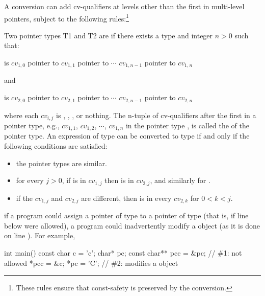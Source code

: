 \pnum
A conversion can add cv-qualifiers at levels other than the first in
multi-level pointers, subject to the following rules:\footnote{These rules ensure that const-safety is preserved by the conversion.}
\begin{indented}
Two pointer types T1 and T2 are  if there exists a
type  and integer $n > 0$ such that:

\begin{indented}
 is $\mathit{cv}_{1,0}$ pointer to $\mathit{cv}_{1,1}$ pointer
to $\cdots$ $\mathit{cv}_{1,n-1}$ pointer to $\mathit{cv}_{1,n}$
\end{indented}

and
\begin{indented}
 is $\mathit{cv}_{2,0}$ pointer to $\mathit{cv}_{2,1}$ pointer
to $\cdots$ $\mathit{cv}_{2,n-1}$ pointer to $\mathit{cv}_{2,n}$
\end{indented}

where each $\mathit{cv}_{i,j}$ is , ,
, or nothing. The n-tuple of cv-qualifiers after
the first in a pointer type, e.g.,
$\mathit{cv}_{1,1}$, $\mathit{cv}_{1,2}$, $\cdots$, $\mathit{cv}_{1,n}$
in the pointer type , is called the  of the pointer type. An expression of type  can be
converted to type  if and only if the following conditions are
satisfied:

\begin{itemize}
\item the pointer types are similar.

\item for every $j > 0$, if  is in $\mathit{cv}_{1,j}$ then  is in $\mathit{cv}_{2,j}$, and similarly for .

\item if the $\mathit{cv}_{1,j}$ and $\mathit{cv}_{2,j}$ are different,
then  is in every $\mathit{cv}_{2,k}$ for $0 < k < j$.
\end{itemize}
\end{indented}

\enternote 
if a program could assign a pointer of type  to a pointer of
type   (that is, if line  below were
allowed), a program could inadvertently modify a  object
(as it is done on line ). For example,

\begin{codeblock}
int main() {
  const char c = 'c';
  char* pc;
  const char** pcc = &pc;       // \#1: not allowed
  *pcc = &c;
  *pc = 'C';                    // \#2: modifies a  object
}
\end{codeblock}
\exitnote 


